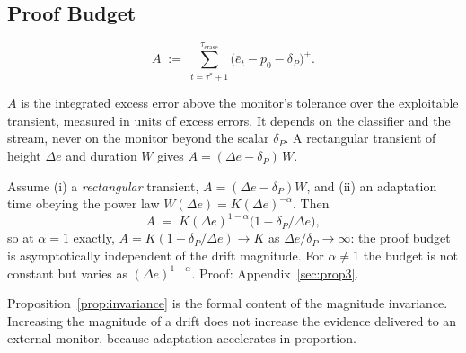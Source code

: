 \subsection{Proof Budget}\label{sec:budget}

\begin{definition}\label{def:budget}
  \begin{equation}\label{eq:budget}
    A \;:=\; \sum_{t = \tau^*+1}^{\tau_{\mathrm{erase}}}
             \bigl(\bar{e}_t - p_0 - \delta_P\bigr)^{+} .
  \end{equation}
\end{definition}

$A$ is the integrated excess error above the monitor's tolerance over the
exploitable transient, measured in units of excess errors. It depends on the
classifier and the stream, never on the monitor beyond the scalar
$\delta_P$. A rectangular transient of height $\Delta e$ and duration $W$
gives $A = (\Delta e - \delta_P)\,W$.

\begin{proposition}\label{prop:invariance}
  Assume (i) a \emph{rectangular} transient, $A = (\Delta e - \delta_P) W$, and
  (ii) an adaptation time obeying the power law
  $W(\Delta e) = K (\Delta e)^{-\alpha}$. Then
  \begin{equation}\label{eq:invariance}
    A \;=\; K (\Delta e)^{1-\alpha}\bigl(1 - \delta_P/\Delta e\bigr),
  \end{equation}
  so at $\alpha = 1$ exactly, $A = K(1 - \delta_P/\Delta e) \to K$ as
  $\Delta e / \delta_P \to \infty$: the proof budget is asymptotically
  independent of the drift magnitude. For $\alpha \ne 1$ the budget is not
  constant but varies as $(\Delta e)^{1-\alpha}$.
  Proof: Appendix~\ref{sec:prop3}.
\end{proposition}

Proposition~\ref{prop:invariance} is the formal content of the magnitude invariance.
Increasing the magnitude of a drift does not increase the evidence delivered
to an external monitor, because adaptation accelerates in proportion.

